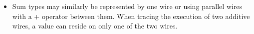 \documentclass[preprint]{sigplanconf}
\begin{document}
\begin{itemize}
\item Sum types may similarly be represented by one wire or using
  parallel wires with a {{+}} operator between them. When tracing the
  execution of two additive wires, a value can reside on only one of the two
  wires.
\begin{multicols}{2}
\begin{center}
\end{center}
\begin{center}
\end{center}
\end{multicols}
\begin{multicols}{2}
\begin{center}
\end{center}
\begin{center}
\end{center}
\end{multicols}




\end{itemize}
\end{document}
